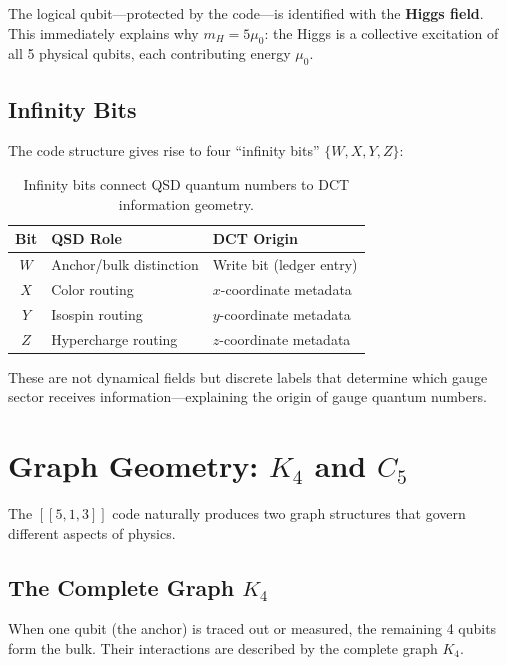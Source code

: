 \documentclass[11pt,a4paper]{article}
\theoremstyle{definition}
\newcommand{\murad}{\mu_0}              %
\newcommand{\mH}{m_H}                   %
\begin{document}
The logical qubit---protected by the code---is identified with the \textbf{Higgs field}. This immediately explains why $\mH = 5\murad$: the Higgs is a collective excitation of all 5 physical qubits, each contributing energy $\murad$.

\subsection{Infinity Bits}

The code structure gives rise to four ``infinity bits'' $\{W, X, Y, Z\}$:

\begin{table}[h]
\centering
\begin{tabular}{cll}
\toprule
\textbf{Bit} & \textbf{QSD Role} & \textbf{DCT Origin} \\
\midrule
$W$ & Anchor/bulk distinction & Write bit (ledger entry) \\
$X$ & Color routing & $x$-coordinate metadata \\
$Y$ & Isospin routing & $y$-coordinate metadata \\
$Z$ & Hypercharge routing & $z$-coordinate metadata \\
\bottomrule
\end{tabular}
\caption{Infinity bits connect QSD quantum numbers to DCT information geometry.}
\label{tab:infinity_bits}
\end{table}

These are not dynamical fields but discrete labels that determine which gauge sector receives information---explaining the origin of gauge quantum numbers.

\section{Graph Geometry: $K_4$ and $C_5$}
\label{sec:graphs}

The $[[5,1,3]]$ code naturally produces two graph structures that govern different aspects of physics.

\subsection{The Complete Graph $K_4$}

When one qubit (the anchor) is traced out or measured, the remaining 4 qubits form the bulk. Their interactions are described by the complete graph $K_4$.
\end{document}

